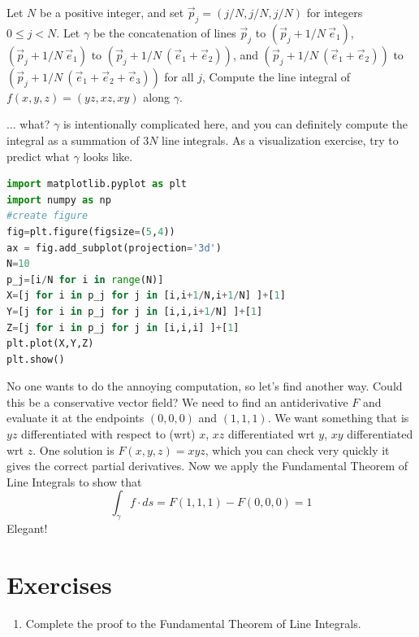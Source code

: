 \documentclass[11pt,openany]{book}
\newcommand*{\exercises}{\section*{\exercisename}}
\newcommand{\exercisename}{Exercises}
\newcommand{\example}[1]{\begin{tcolorbox}[title=Example,colframe=yellow!50!white,colback=yellow!20!white,coltitle=black]{#1}\end{tcolorbox}
}
\begin{document}
	\example{
	Let $N$ be a positive integer, and set $\vec{p}_j = (j/N,j/N,j/N)$ for integers $0 \leq j < N$.
	Let $\gamma$ be the concatenation of lines $\vec{p}_j$ to $(\vec{p}_j+ 1/N \ \vec{e}_1)$,
	$(\vec{p}_j+ 1/N \ \vec{e}_1)$ to $(\vec{p}_j+ 1/N \ (\vec{e}_1 + \vec{e}_2))$, and 
	$(\vec{p}_j+ 1/N \ (\vec{e}_1 + \vec{e}_2))$ to $(\vec{p}_j+ 1/N \ (\vec{e}_1 + \vec{e}_2 + \vec{e}_3))$ for all $j$,
	Compute the line integral of $f(x,y,z)= (yz,xz,xy)$ along $\gamma$.
	}
	... what? $\gamma$ is intentionally complicated here, and you can definitely compute the integral as a summation of $3N$ line integrals.
	As a visualization exercise, try to predict what $\gamma$ looks like.
	\begin{lstlisting}[language=Python]
import matplotlib.pyplot as plt
import numpy as np
#create figure
fig=plt.figure(figsize=(5,4))
ax = fig.add_subplot(projection='3d')
N=10
p_j=[i/N for i in range(N)]
X=[j for i in p_j for j in [i,i+1/N,i+1/N] ]+[1]
Y=[j for i in p_j for j in [i,i,i+1/N] ]+[1]
Z=[j for i in p_j for j in [i,i,i] ]+[1]
plt.plot(X,Y,Z)
plt.show()
	\end{lstlisting}
	No one wants to do the annoying computation, so let's find another way.
	Could this be a conservative vector field? We need to find an antiderivative $F$ and evaluate it at the endpoints $(0,0,0)$ and $(1,1,1)$.
	We want something that is $yz$ differentiated with respect to (wrt) $x$, $xz$ differentiated wrt $y$, $xy$ differentiated wrt $z$.
	One solution is $F(x,y,z)=xyz$, which you can check very quickly it gives the correct partial derivatives.
	Now we apply the Fundamental Theorem of Line Integrals to show that
	\[
	\int_{\gamma} f\cdot ds = F(1,1,1) - F(0,0,0) = 1
	\]
	Elegant!
	\exercises
	\begin{enumerate}
		\item Complete the proof to the Fundamental Theorem of Line Integrals.
	\end{enumerate}
	
\end{document}
